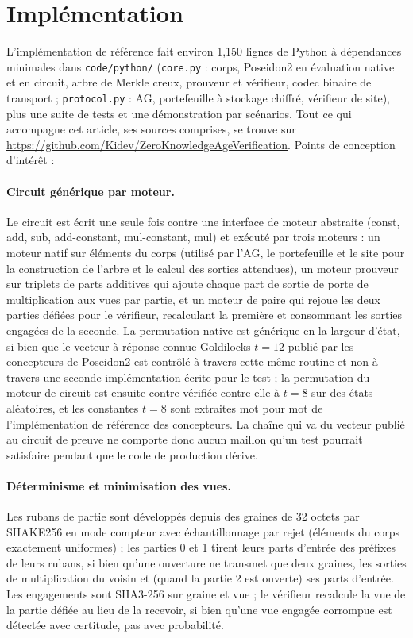 \documentclass[11pt]{article}
\theoremstyle{definition}
\begin{document}
\section{Implémentation}
\label{sec:impl}

L'implémentation de référence fait environ 1{,}150 lignes de Python à dépendances minimales
dans \texttt{code/python/} (\texttt{core.py} : corps, Poseidon2 en évaluation native et en
circuit, arbre de Merkle creux, prouveur et vérifieur, codec binaire de transport ;
\texttt{protocol.py} : AG, portefeuille à stockage chiffré, vérifieur de site), plus une
suite de tests et une démonstration par scénarios. Tout ce qui accompagne cet article, ses
sources comprises, se trouve sur
\url{https://github.com/Kidev/ZeroKnowledgeAgeVerification}. Points de conception
d'intérêt :

\paragraph{Circuit générique par moteur.} Le circuit est écrit une seule fois contre une
interface de moteur abstraite (const, add, sub, add-constant, mul-constant, mul) et
exécuté par trois moteurs : un moteur natif sur éléments du corps (utilisé par l'AG, le
portefeuille et le site pour la construction de l'arbre et le calcul des sorties
attendues), un moteur prouveur sur triplets de parts additives qui ajoute chaque part de
sortie de porte de multiplication aux vues par partie, et un moteur de paire qui rejoue
les deux parties défiées pour le vérifieur, recalculant la première et consommant les
sorties engagées de la seconde. La permutation native est
générique en la largeur d'état, si bien que le vecteur à réponse connue Goldilocks $t =
12$ publié par les concepteurs de Poseidon2 est contrôlé à travers cette même routine et
non à travers une seconde implémentation écrite pour le test ; la permutation du moteur de
circuit est ensuite contre-vérifiée contre elle à $t = 8$ sur des états aléatoires, et les
constantes $t = 8$ sont extraites mot pour mot de l'implémentation de référence des
concepteurs. La chaîne qui va du vecteur publié au circuit de preuve ne comporte donc
aucun maillon qu'un test pourrait satisfaire pendant que le code de production dérive.

\paragraph{Déterminisme et minimisation des vues.} Les rubans de partie sont développés
depuis des graines de 32 octets par SHAKE256 en mode compteur avec échantillonnage par
rejet (éléments du corps exactement uniformes) ; les parties 0 et 1 tirent leurs parts
d'entrée des préfixes de leurs rubans, si bien qu'une ouverture ne transmet que deux
graines, les sorties de multiplication du voisin et (quand la partie 2 est ouverte) ses
parts d'entrée. Les engagements sont SHA3-256 sur graine et vue ; le vérifieur recalcule
la vue de la partie défiée au lieu de la recevoir, si bien qu'une vue engagée corrompue
est détectée avec certitude, pas avec probabilité.
\end{document}
